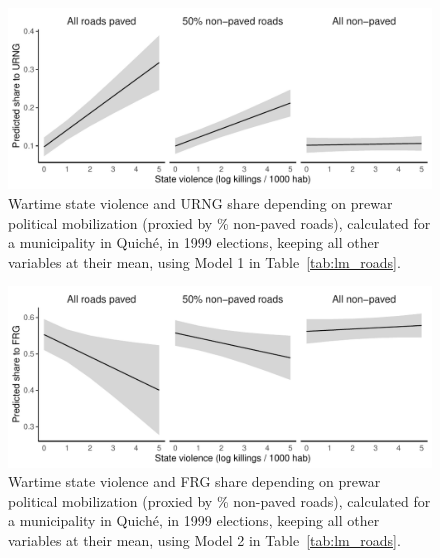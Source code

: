 \documentclass[12pt, notitlepage]{article}
\begin{document}
\begin{figure}[htb!]
  \centering
    \includegraphics[width = .75\textwidth]{img/pp_URNG_roads}

  \caption{Wartime state violence and URNG share depending on prewar political mobilization (proxied by \% non-paved roads), calculated for a municipality in Quiché, in 1999 elections, keeping all other variables at their mean, using Model 1 in Table~\ref{tab:lm_roads}.} \label{fig:pp_URNG_roads}


\end{figure}

\begin{figure}[htb!]
  \centering
    \includegraphics[width = .75\textwidth]{img/pp_FRG_roads}

  \caption{Wartime state violence and FRG share depending on prewar political mobilization (proxied by \% non-paved roads), calculated for a municipality in Quiché, in 1999 elections, keeping all other variables at their mean, using Model 2 in Table~\ref{tab:lm_roads}.} \label{fig:pp_FRG_roads}


\end{figure}
\end{document}
